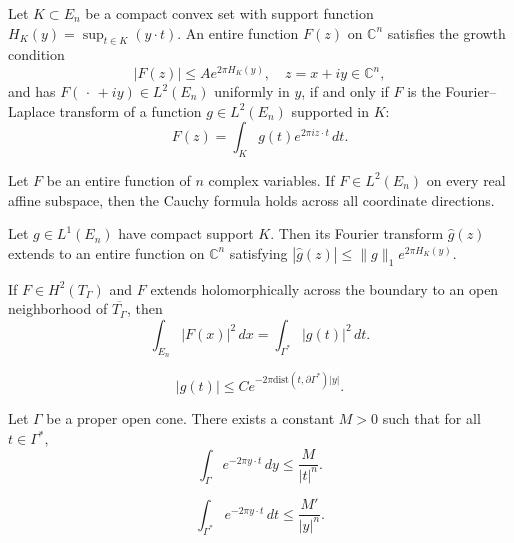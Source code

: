 \begin{theorem}\label{thm:c3-4-1}
Let $K \subset E_n$ be a compact convex set with support function $H_K(y) = \sup_{t \in K} (y \cdot t)$. An entire function $F(z)$ on $\mathbb{C}^n$ satisfies the growth condition
\[
|F(z)| \leq A e^{2\pi H_K(y)}, \quad z = x + iy \in \mathbb{C}^n,
\]
and has $F(\,\cdot\, + iy) \in L^2(E_n)$ uniformly in $y$, if and only if $F$ is the Fourier--Laplace transform of a function $g \in L^2(E_n)$ supported in $K$:
\[
F(z) = \int_K g(t) e^{2\pi i z \cdot t}\,dt.
\]
\end{theorem}

\begin{lemma}\label{lem:c3-4-2}
Let $F$ be an entire function of $n$ complex variables. If $F \in L^2(E_n)$ on every real affine subspace, then the Cauchy formula holds across all coordinate directions.
\end{lemma}

\begin{lemma}\label{lem:c3-4-3}
Let $g \in L^1(E_n)$ have compact support $K$. Then its Fourier transform $\hat{g}(z)$ extends to an entire function on $\mathbb{C}^n$ satisfying $|\hat{g}(z)| \leq \|g\|_1 e^{2\pi H_K(y)}$.
\end{lemma}

\begin{lemma}\label{lem:c3-4-4}
If $F \in H^2(T_\Gamma)$ and $F$ extends holomorphically across the boundary to an open neighborhood of $\overline{T_\Gamma}$, then
\begin{equation}\label{eq:c3-4-5}
\int_{E_n} |F(x)|^2\,dx = \int_{\Gamma^*} |g(t)|^2\,dt.
\end{equation}
\end{lemma}

\begin{equation}\label{eq:c3-4-6}
|g(t)| \leq C e^{-2\pi \text{dist}(t, \partial \Gamma^*) |y|}.
\end{equation}

\begin{lemma}\label{lem:c3-4-7}
Let $\Gamma$ be a proper open cone. There exists a constant $M > 0$ such that for all $t \in \Gamma^*$,
\begin{equation}\label{eq:c3-4-8}
\int_\Gamma e^{-2\pi y \cdot t}\,dy \leq \frac{M}{|t|^n}.
\end{equation}
\end{lemma}

\begin{equation}\tag{4.8$'$}\label{eq:c3-4-8p}
\int_{\Gamma^*} e^{-2\pi y \cdot t}\,dt \leq \frac{M'}{|y|^n}.
\end{equation}

